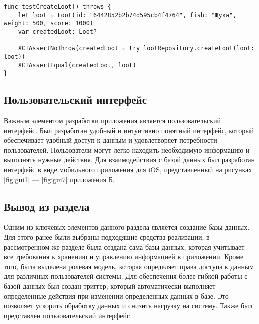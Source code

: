 \begin{lstlisting}[label=lst:cod, caption=Код unit--теста]
func testCreateLoot() throws {
	let loot = Loot(id: "6442852b2b74d595cb4f4764", fish: "Щука", weight: 500, score: 1000)
	var createdLoot: Loot?
        
	XCTAssertNoThrow(createdLoot = try lootRepository.createLoot(loot: loot))
	XCTAssertEqual(createdLoot, loot)
}
\end{lstlisting}

\subsection{Пользовательский интерфейс}

Важным элементом разработки приложения является пользовательский интерфейс. Был разработан удобный и интуитивно понятный интерфейс, который обеспечивает удобный доступ к данным и удовлетворяет потребности пользователей. Пользователи могут легко находить необходимую информацию и выполнять нужные действия. Для взаимодействия с базой данных был разработан интерфейс в виде мобильного приложения для iOS, представленный на рисунках \ref{fig:gui1} ---  \ref{fig:gui7} приложения Б.


\subsection{Вывод из раздела}

Одним из ключевых элементов данного раздела является создание базы данных. Для этого ранее были выбраны подходящие средства реализации, в рассмотренном же разделе была создана сама базы данных, которая учитывает все требования к хранению и управлению информацией в приложении. Кроме того, была выделена ролевая модель, которая определяет права доступа к данным для различных пользователей системы. Для обеспечения более гибкой работы с базой данных был создан триггер, который автоматически выполняет определенные действия при изменении определенных данных в базе. Это позволяет ускорить обработку данных и снизить нагрузку на систему. Также был представлен пользовательский интерфейс.
